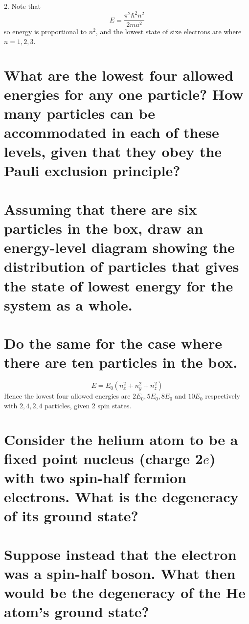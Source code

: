\documentclass[answers]{exam}
\begin{document}
\begin{questions}
\begin{solution}
	2. Note that
	$$E = \frac{\pi^2\hbar^2n^2}{2ma^2}$$
	so energy is proportional to $n^2$, and the lowest state of sixe electrons are where $n=1,2,3$.
\end{solution}


\begin{parts}
	\part{What are the lowest four allowed energies for any one particle? How many particles can be accommodated in each of these levels, given that they obey the Pauli exclusion principle?}
	\part{Assuming that there are six particles in the box, draw an energy-level diagram showing the distribution of particles that gives the state of lowest energy for the system as a whole.}
	\part{Do the same for the case where there are ten particles in the box.}
\end{parts}

\begin{solution}
	$$E = E_0(n_x^2 + n_y^2 + n_z^2)$$
	Hence the lowest four allowed energies are $2E_0, 5E_0, 8E_0$ and $10E_0$ respectively with $2, 4, 2, 4$ particles, given 2 spin states.
\end{solution}

\question{}

\begin{parts}
	\part{Consider the helium atom to be a fixed point nucleus (charge 2$e$) with two spin-half fermion electrons. What is the degeneracy of its ground state?}
	\part{Suppose instead that the electron was a spin-half boson. What then would be the degeneracy of the He atom's ground state?}

\end{parts}
\end{questions}
\end{document}
